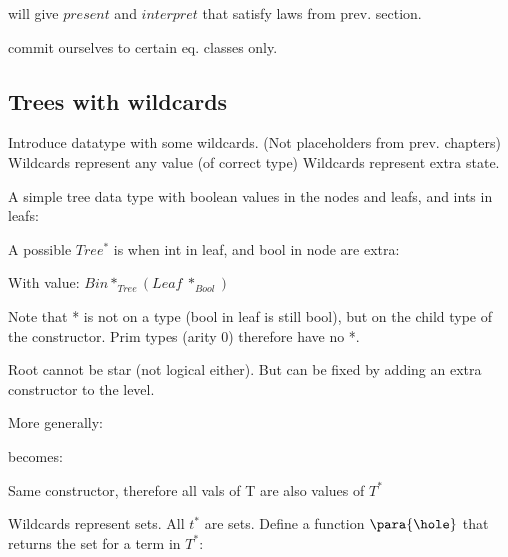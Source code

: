 will give $present$ and $interpret$ that satisfy laws from prev. section.

commit ourselves to certain eq. classes only.




\subsection{Trees with wildcards}

Introduce datatype with some wildcards. (Not placeholders from prev. chapters) Wildcards represent any value (of correct type) Wildcards represent extra state.


A simple tree data type with boolean values in the nodes and leafs, and ints in leafs:


A possible $Tree^*$ is when int in leaf, and bool in node are extra:


With value: $Bin *_{Tree} (Leaf~*_{Bool})$ 

Note that * is not on a type (bool in leaf is still bool), but on the child type of the constructor. Prim types (arity 0) therefore have no *.

Root cannot be star (not logical either). But can be fixed by adding an extra constructor to the level.

More generally:

becomes:

Same constructor, therefore all vals of T are also values of $T^*$



Wildcards represent sets. All $t^*$ are sets.  Define a function $\para{\hole}$ that returns the set for a term in $T^*$:




